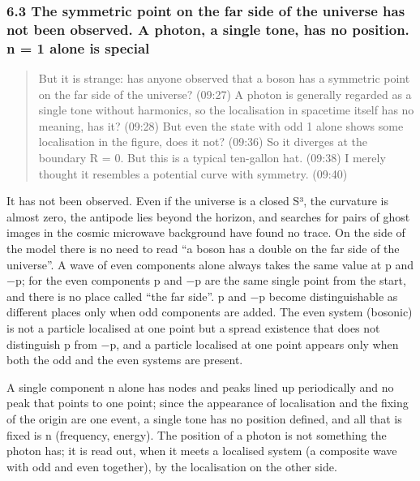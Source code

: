 \documentclass[
  a4paper,
]{article}
\begin{document}
\subsubsection{6.3 The symmetric point on the far side of the universe
has not been observed. A photon, a single tone, has no position. n = 1
alone is
special}\label{the-symmetric-point-on-the-far-side-of-the-universe-has-not-been-observed.-a-photon-a-single-tone-has-no-position.-n-1-alone-is-special}

\begin{quote}
But it is strange: has anyone observed that a boson has a symmetric
point on the far side of the universe? (09:27) A photon is generally
regarded as a single tone without harmonics, so the localisation in
spacetime itself has no meaning, has it? (09:28) But even the state with
odd 1 alone shows some localisation in the figure, does it not? (09:36)
So it diverges at the boundary R = 0. But this is a typical ten-gallon
hat. (09:38) I merely thought it resembles a potential curve with
symmetry. (09:40)
\end{quote}

It has not been observed. Even if the universe is a closed S³, the
curvature is almost zero, the antipode lies beyond the horizon, and
searches for pairs of ghost images in the cosmic microwave background
have found no trace. On the side of the model there is no need to read
``a boson has a double on the far side of the universe''. A wave of even
components alone always takes the same value at p and −p; for the even
components p and −p are the same single point from the start, and there
is no place called ``the far side''. p and −p become distinguishable as
different places only when odd components are added. The even system
(bosonic) is not a particle localised at one point but a spread
existence that does not distinguish p from −p, and a particle localised
at one point appears only when both the odd and the even systems are
present.

A single component n alone has nodes and peaks lined up periodically and
no peak that points to one point; since the appearance of localisation
and the fixing of the origin are one event, a single tone has no
position defined, and all that is fixed is n (frequency, energy). The
position of a photon is not something the photon has; it is read out,
when it meets a localised system (a composite wave with odd and even
together), by the localisation on the other side.
\end{document}
